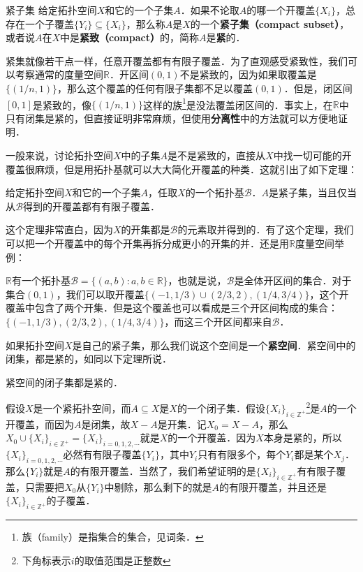 \begin{definition}{紧子集}\label{Topo2_def1}
给定拓扑空间$X$和它的一个子集$A$．如果不论取$A$的哪一个开覆盖$\{X_i\}$，总存在一个子覆盖$\{Y_i\}\subseteq \{X_i\}$，那么称$A$是$X$的一个\textbf{紧子集（compact subset）}，或者说$A$在$X$中是\textbf{紧致（compact）}的，简称$A$是\textbf{紧}的．
\end{definition}

紧集就像若干点一样，任意开覆盖都有有限子覆盖．为了直观感受紧致性，我们可以考察通常的度量空间$\mathbb{R}$．开区间$(0,1)$不是紧致的，因为如果取覆盖是$\{(1/n, 1)\}$，那么这个覆盖的任何有限子集都不足以覆盖$(0, 1)$．但是，闭区间$[0,1]$是紧致的，像$\{(1/n, 1)\}$这样的族\footnote{族（family）是指集合的集合，见词条．}是没法覆盖闭区间的．事实上，在$\mathbb{R}$中只有闭集是紧的，但直接证明非常麻烦，但使用\textbf{分离性}中的方法就可以方便地证明．

一般来说，讨论拓扑空间$X$中的子集$A$是不是紧致的，直接从$X$中找一切可能的开覆盖很麻烦，但是用拓扑基就可以大大简化开覆盖的种类．这就引出了如下定理：

\begin{theorem}{}\label{Topo2_the1}
给定拓扑空间$X$和它的一个子集$A$，任取$X$的一个拓扑基$\mathcal{B}$．$A$是紧子集，当且仅当从$\mathcal{B}$得到的开覆盖都有有限子覆盖．
\end{theorem}

这个定理非常直白，因为$X$的开集都是$\mathcal{B}$的元素取并得到的．有了这个定理，我们可以把一个开覆盖中的每个开集再拆分成更小的开集的并．还是用$\mathbb{R}$度量空间举例：

\begin{example}{}\label{Topo2_ex1}
$\mathbb{R}$有一个拓扑基$\mathcal{B}=\{(a,b):a,b\in \mathbb{R}\}$，也就是说，$\mathcal{B}$是全体开区间的集合．对于集合$(0,1)$，我们可以取开覆盖$\{(-1,1/3)\cup(2/3,2), (1/4, 3/4)\}$，这个开覆盖中包含了两个开集．但是这个覆盖也可以看成是三个开区间构成的集合：$\{(-1,1/3), (2/3,2), (1/4, 3/4)\}$，而这三个开区间都来自$\mathcal{B}$．

\end{example}

如果拓扑空间$X$是自己的紧子集，那么我们说这个空间是一个\textbf{紧空间}．紧空间中的闭集，都是紧的，如同以下定理所说．

\begin{theorem}{}\label{Topo2_the2}
紧空间的闭子集都是紧的．
\end{theorem}

假设$X$是一个紧拓扑空间，而$A\subseteq X$是$X$的一个闭子集．假设$\{X_i\}_{i\in \mathbb{Z}^+}$\footnote{下角标表示$i$的取值范围是正整数}是$A$的一个开覆盖，而因为$A$是闭集，故$X-A$是开集．记$X_0=X-A$，那么$X_0\cup\{X_i\}_{i\in \mathbb{Z}^+}=\{X_i\}_{i=0, 1, 2, \cdots}$就是$X$的一个开覆盖．因为$X$本身是紧的，所以$\{X_i\}_{i=0, 1, 2, \cdots}$必然有有限子覆盖$\{Y_i\}$，其中$Y_i$只有有限多个，每个$Y_i$都是某个$X_j$．那么$\{Y_i\}$就是$A$的有限开覆盖．当然了，我们希望证明的是$\{X_i\}_{i\in \mathbb{Z}^+}$有有限子覆盖，只需要把$X_0$从$\{Y_i\}$中剔除，那么剩下的就是$A$的有限开覆盖，并且还是$\{X_i\}_{i\in \mathbb{Z}^+}$的子覆盖．

